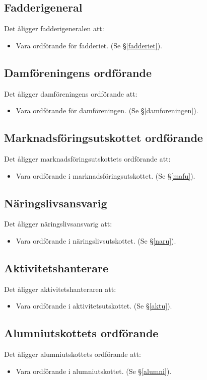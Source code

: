 \documentclass{datateknologsektionen-document}
\begin{document}
\subsection{Fadderigeneral}
Det åligger fadderigeneralen att:
\begin{itemize}
  \item Vara ordförande för fadderiet. (Se \S \ref{fadderiet}).
\end{itemize}
\subsection{Damföreningens ordförande}
Det åligger damföreningens ordförande att:
\begin{itemize}
  \item Vara ordförande för damföreningen. (Se \S \ref{damforeningen}).
\end{itemize}
\subsection{Marknadsföringsutskottet ordförande}
Det åligger marknadsföringsutskottets ordförande att:
\begin{itemize}
  \item Vara ordförande i marknadsföringsutskottet. (Se \S \ref{mafu}).
\end{itemize}
\subsection{Näringslivsansvarig}
Det åligger näringslivsansvarig att:
\begin{itemize}
  \item Vara ordförande i näringslivsutskottet. (Se \S \ref{naru}).
\end{itemize}
\subsection{Aktivitetshanterare}
Det åligger aktivitetshanteraren att:
\begin{itemize}
  \item Vara ordförande i aktivitetsutskottet. (Se \S \ref{aktu}).
\end{itemize}


\subsection{Alumniutskottets ordförande}
Det åligger alumniutskottets ordförande att:
\begin{itemize}
  \item Vara ordförande i alumniutskottet. (Se \S \ref{alumni}).
\end{itemize}
\end{document}
